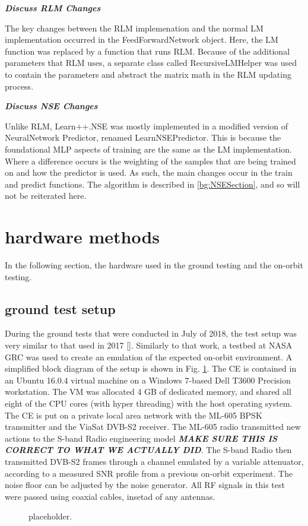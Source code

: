 \par\textbf{\textit{Discuss RLM Changes}}
\par The key changes between the RLM implemenation and the normal LM implementation occurred in the FeedForwardNetwork object. Here, the LM function was replaced by a function that runs RLM. Because of the additional parameters that RLM uses, a separate class called RecursiveLMHelper was used to contain the parameters and abstract the matrix math in the RLM updating process.
\par\textbf{\textit{Discuss NSE Changes}}
\par Unlike RLM, Learn++.NSE was mostly implemented in a modified version of NeuralNetwork Predictor, renamed LearnNSEPredictor. This is because the foundational MLP aspects of training are the same as the LM implementation. Where a difference occurs is the weighting of the samples that are being trained on and how the predictor is used. As such, the main changes occur in the train and predict functions. The algorithm is described in \ref{bg:NSESection}, and so will not be reiterated here.
\section{hardware methods}\label{BG:hardware}
\par In the following section, the hardware used in the ground testing and the on-orbit testing.
\subsection{ground test setup}
\par During the ground tests that were conducted in July of 2018, the test setup was very similar to that used in 2017 [\cite{tim_implementation}].  Similarly to that work, a testbed at NASA GRC was used to create an emulation of the expected on-orbit environment. A simplified block diagram of the setup is shown in Fig. \ref{methods:groundTestFig}. The CE is contained in an Ubuntu 16.0.4 virtual machine on a Windows 7-based Dell T3600 Precision workstation. The VM was allocated 4 GB of dedicated memory, and shared all eight of the CPU cores (with hyper threading) with the host operating system. The CE is put on a private local area network with the ML-605 BPSK transmitter and the ViaSat DVB-S2 receiver. The ML-605 radio transmitted new actions to the S-band Radio engineering model \textbf{\textit{MAKE SURE THIS IS CORRECT TO WHAT WE ACTUALLY DID}}. The S-band Radio then transmitted DVB-S2 frames through a channel emulated by a variable attenuator, according to a measured SNR profile from a previous on-orbit experiment. The noise floor can be adjusted by the noise generator. All RF signals in this test were passed using coaxial cables, insetad of any antennas.
\begin{figure}[ht]
\label{methods:groundTestFig}
\caption{placeholder.}
\end{figure} 

